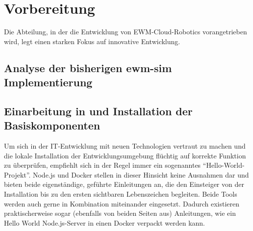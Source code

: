 \chapter{Vorbereitung}
Die Abteilung, in der die Entwicklung von \ac{EWM}-Cloud-Robotics vorangetrieben wird, legt einen starken Fokus auf innovative Entwicklung.

\section{Analyse der bisherigen ewm-sim Implementierung}

\section{Einarbeitung in und Installation der Basiskomponenten}
\label{sec:einarbeitung}
Um sich in der IT-Entwicklung mit neuen Technologien vertraut zu machen und die lokale Installation der Entwicklungsumgebung flüchtig auf korrekte Funktion zu überprüfen, empfiehlt sich in der Regel immer ein sogenanntes \enquote{Hello-World-Projekt}.
Node.js und Docker stellen in dieser Hinsicht keine Ausnahmen dar und bieten beide eigenständige, geführte Einleitungen an, die den Einsteiger von der Installation bis zu den ersten sichtbaren Lebenszeichen begleiten.
Beide Tools werden auch gerne in Kombination miteinander eingesetzt.
Dadurch existieren praktischerweise sogar (ebenfalls von beiden Seiten aus) Anleitungen, wie ein Hello World Node.js-Server in einen Docker verpackt werden kann.

